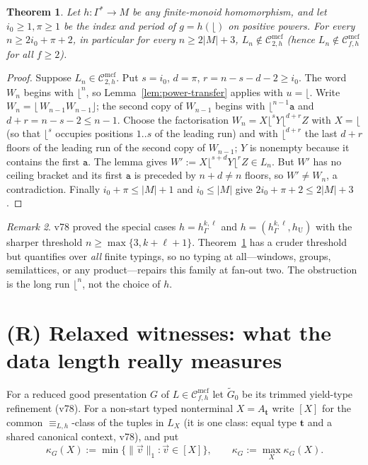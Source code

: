 \documentclass[11pt]{article}
\newtheorem{theorem}{Theorem}
\theoremstyle{definition}
\theoremstyle{remark}
\newtheorem{remark}[theorem]{Remark}
\newcommand{\Cmcf}[2]{\mathcal{C}^{\mathrm{mcf}}_{#1,#2}}
\newcommand{\tuple}[1]{\vec{#1}}
\newcommand{\fl}{\lfloor}
\newcommand{\fr}{\rfloor}
\begin{document}
\begin{theorem}\label{thm:all-typings}
Let $h:\Gamma^*\to M$ be any finite-monoid homomorphism, and let
$i_0\ge1,\pi\ge1$ be the index and period of $g=h(\fl)$ on positive
powers.  For every $n\ge 2i_0+\pi+2$, in particular for every
$n\ge 2|M|+3$, $L_n\notin\Cmcf{2}{h}$ (hence $L_n\notin\Cmcf{f}{h}$ for all
$f\ge2$).
\end{theorem}
\begin{proof}
Suppose $L_n\in\Cmcf{2}{h}$.  Put $s=i_0$, $d=\pi$, $r=n-s-d-2\ge i_0$.
The word $W_n$ begins with $\fl^n$, so Lemma~\ref{lem:power-transfer}
applies with $u=\fl$.  Write $W_n=\fl\,W_{n-1}W_{n-1}\fr$; the second copy
of $W_{n-1}$ begins with $\fl^{n-1}\mathtt a$ and $d+r=n-s-2\le n-1$.
Choose the factorisation $W_n=X\fl^sY\fl^{d+r}Z$ with $X=\fl$ (so that
$\fl^s$ occupies positions $1..s$ of the leading run) and with
$\fl^{d+r}$ the last $d+r$ floors of the leading run of the second copy of
$W_{n-1}$; $Y$ is nonempty because it contains the first $\mathtt a$.  The
lemma gives $W':=X\fl^{s+d}Y\fl^{r}Z\in L_n$.  But $W'$ has no ceiling
bracket and its first $\mathtt a$ is preceded by $n+d\neq n$ floors, so
$W'\neq W_n$, a contradiction.  Finally $i_0+\pi\le|M|+1$ and $i_0\le|M|$
give $2i_0+\pi+2\le2|M|+3$.
\end{proof}

\begin{remark}
v78 proved the special cases $h=h^{k,\ell}_\Gamma$ and
$h=(h^{k,\ell}_\Gamma,h_{\mathrm U})$ with the sharper threshold
$n\ge\max\{3,k+\ell+1\}$.  Theorem~\ref{thm:all-typings} has a cruder
threshold but quantifies over \emph{all} finite typings, so no typing at
all---windows, groups, semilattices, or any product---repairs this family
at fan-out two.  The obstruction is the long run $\fl^n$, not the choice of
$h$.
\end{remark}

\section{(R) Relaxed witnesses: what the data length really measures}

For a reduced good presentation $G$ of $L\in\Cmcf{f}{h}$ let
$\widetilde G_0$ be its trimmed yield-type refinement (v78).  For a
non-start typed nonterminal $X=A_{\mathbf t}$ write $[X]$ for the common
$\equiv_{L,h}$-class of the tuples in $L_X$ (it is one class: equal type
$\mathbf t$ and a shared canonical context, v78), and put
\[
 \kappa_G(X):=\min\{\|\tuple v\|_1:\tuple v\in[X]\},
 \qquad
 \kappa_G:=\max_X\kappa_G(X).
\]
\end{document}
